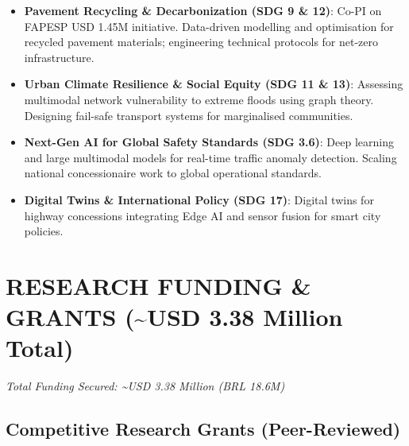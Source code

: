 \documentclass[
  10pt,
  a4paper,
  DIV=11,
  numbers=noendperiod]{scrartcl}
\begin{document}
\begin{itemize}
\item
  \textbf{Pavement Recycling \& Decarbonization (SDG 9 \& 12)}: Co-PI on
  FAPESP USD 1.45M initiative. Data-driven modelling and optimisation
  for recycled pavement materials; engineering technical protocols for
  net-zero infrastructure.
\item
  \textbf{Urban Climate Resilience \& Social Equity (SDG 11 \& 13)}:
  Assessing multimodal network vulnerability to extreme floods using
  graph theory. Designing fail-safe transport systems for marginalised
  communities.
\item
  \textbf{Next-Gen AI for Global Safety Standards (SDG 3.6)}: Deep
  learning and large multimodal models for real-time traffic anomaly
  detection. Scaling national concessionaire work to global operational
  standards.
\item
  \textbf{Digital Twins \& International Policy (SDG 17)}: Digital twins
  for highway concessions integrating Edge AI and sensor fusion for
  smart city policies.
\end{itemize}

\hrulefill

\section{RESEARCH FUNDING \& GRANTS (\textasciitilde USD 3.38 Million
Total)}\label{research-funding-grants-usd-3.38-million-total}

\emph{Total Funding Secured: \textasciitilde USD 3.38 Million (BRL
18.6M)}

\subsection{Competitive Research Grants
(Peer-Reviewed)}\label{competitive-research-grants-peer-reviewed}
\end{document}
